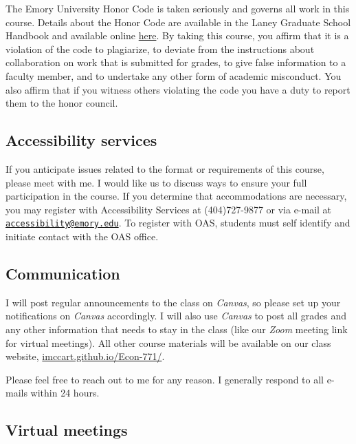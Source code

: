 \documentclass[11pt,]{article}
\begin{document}
The Emory University Honor Code is taken seriously and governs all work
in this course. Details about the Honor Code are available in the Laney
Graduate School Handbook and available online
\href{https://www.gs.emory.edu/academics/policies-progress/conduct.html}{here}.
By taking this course, you affirm that it is a violation of the code to
plagiarize, to deviate from the instructions about collaboration on work
that is submitted for grades, to give false information to a faculty
member, and to undertake any other form of academic misconduct. You also
affirm that if you witness others violating the code you have a duty to
report them to the honor council.

\hypertarget{accessibility-services}{%
\subsection{Accessibility services}\label{accessibility-services}}

If you anticipate issues related to the format or requirements of this
course, please meet with me. I would like us to discuss ways to ensure
your full participation in the course. If you determine that
accommodations are necessary, you may register with Accessibility
Services at (404)727-9877 or via e-mail at
\href{mailto:accessibility@emory.edu}{\nolinkurl{accessibility@emory.edu}}.
To register with OAS, students must self identify and initiate contact
with the OAS office.

\hypertarget{communication}{%
\subsection{Communication}\label{communication}}

I will post regular announcements to the class on \emph{Canvas}, so
please set up your notifications on \emph{Canvas} accordingly. I will
also use \emph{Canvas} to post all grades and any other information that
needs to stay in the class (like our \emph{Zoom} meeting link for
virtual meetings). All other course materials will be available on our
class website,
\href{https://imccart.github.io/Econ-771/}{imccart.github.io/Econ-771/}.

Please feel free to reach out to me for any reason. I generally respond
to all e-mails within 24 hours.

\hypertarget{virtual-meetings}{%
\subsection{Virtual meetings}\label{virtual-meetings}}
\end{document}
